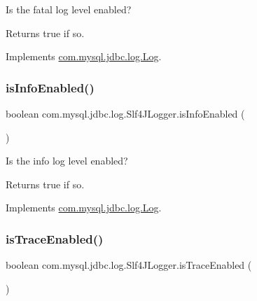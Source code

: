 Is the \textquotesingle{}fatal\textquotesingle{} log level enabled?

\begin{DoxyReturn}{Returns}
true if so. 
\end{DoxyReturn}


Implements \mbox{\hyperlink{interfacecom_1_1mysql_1_1jdbc_1_1log_1_1_log_acc3f527d8a1e3143e312eb4368c3632a}{com.\+mysql.\+jdbc.\+log.\+Log}}.

\mbox{\label{classcom_1_1mysql_1_1jdbc_1_1log_1_1_slf4_j_logger_aa1c98d717c733fbc6f6d6e68c129f387}} 
\subsubsection{\texorpdfstring{is\+Info\+Enabled()}{isInfoEnabled()}}
{\footnotesize\ttfamily boolean com.\+mysql.\+jdbc.\+log.\+Slf4\+J\+Logger.\+is\+Info\+Enabled (\begin{DoxyParamCaption}{ }\end{DoxyParamCaption})}

Is the \textquotesingle{}info\textquotesingle{} log level enabled?

\begin{DoxyReturn}{Returns}
true if so. 
\end{DoxyReturn}


Implements \mbox{\hyperlink{interfacecom_1_1mysql_1_1jdbc_1_1log_1_1_log_a8ca112798ee938dfb0fa06ffca504922}{com.\+mysql.\+jdbc.\+log.\+Log}}.

\mbox{\label{classcom_1_1mysql_1_1jdbc_1_1log_1_1_slf4_j_logger_a464b8fdfdb20e2b18de01ec28395419b}} 
\subsubsection{\texorpdfstring{is\+Trace\+Enabled()}{isTraceEnabled()}}
{\footnotesize\ttfamily boolean com.\+mysql.\+jdbc.\+log.\+Slf4\+J\+Logger.\+is\+Trace\+Enabled (\begin{DoxyParamCaption}{ }\end{DoxyParamCaption})}

